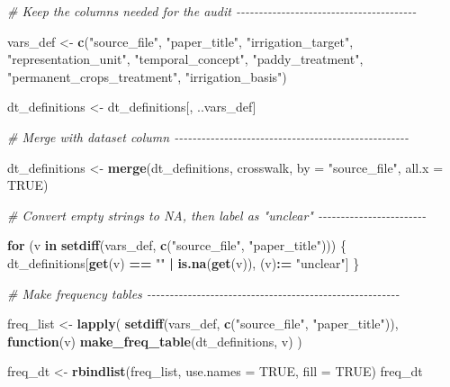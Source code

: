 \documentclass[
  11pt,
]{article}
\newenvironment{Shaded}{\begin{snugshade}}{\end{snugshade}}
\newcommand{\AttributeTok}[1]{\textcolor[rgb]{0.13,0.29,0.53}{#1}}
\newcommand{\CommentTok}[1]{\textcolor[rgb]{0.56,0.35,0.01}{\textit{#1}}}
\newcommand{\ConstantTok}[1]{\textcolor[rgb]{0.56,0.35,0.01}{#1}}
\newcommand{\ControlFlowTok}[1]{\textcolor[rgb]{0.13,0.29,0.53}{\textbf{#1}}}
\newcommand{\FunctionTok}[1]{\textcolor[rgb]{0.13,0.29,0.53}{\textbf{#1}}}
\newcommand{\NormalTok}[1]{#1}
\newcommand{\OtherTok}[1]{\textcolor[rgb]{0.56,0.35,0.01}{#1}}
\newcommand{\SpecialCharTok}[1]{\textcolor[rgb]{0.81,0.36,0.00}{\textbf{#1}}}
\newcommand{\StringTok}[1]{\textcolor[rgb]{0.31,0.60,0.02}{#1}}
\begin{document}
\begin{Shaded}
\begin{Highlighting}[]
\CommentTok{\# Keep the columns needed for the audit {-}{-}{-}{-}{-}{-}{-}{-}{-}{-}{-}{-}{-}{-}{-}{-}{-}{-}{-}{-}{-}{-}{-}{-}{-}{-}{-}{-}{-}{-}{-}{-}{-}{-}{-}{-}{-}{-}{-}{-}}

\NormalTok{vars\_def }\OtherTok{\textless{}{-}} \FunctionTok{c}\NormalTok{(}\StringTok{"source\_file"}\NormalTok{,}
              \StringTok{"paper\_title"}\NormalTok{,}
              \StringTok{"irrigation\_target"}\NormalTok{,}
              \StringTok{"representation\_unit"}\NormalTok{,}
              \StringTok{"temporal\_concept"}\NormalTok{,}
              \StringTok{"paddy\_treatment"}\NormalTok{,}
              \StringTok{"permanent\_crops\_treatment"}\NormalTok{,}
              \StringTok{"irrigation\_basis"}\NormalTok{)}

\NormalTok{dt\_definitions }\OtherTok{\textless{}{-}}\NormalTok{ dt\_definitions[, ..vars\_def]}

\CommentTok{\# Merge with dataset column {-}{-}{-}{-}{-}{-}{-}{-}{-}{-}{-}{-}{-}{-}{-}{-}{-}{-}{-}{-}{-}{-}{-}{-}{-}{-}{-}{-}{-}{-}{-}{-}{-}{-}{-}{-}{-}{-}{-}{-}{-}{-}{-}{-}{-}{-}{-}{-}{-}{-}{-}{-}}

\NormalTok{dt\_definitions }\OtherTok{\textless{}{-}} \FunctionTok{merge}\NormalTok{(dt\_definitions, crosswalk, }\AttributeTok{by =} \StringTok{"source\_file"}\NormalTok{, }\AttributeTok{all.x =} \ConstantTok{TRUE}\NormalTok{)}

\CommentTok{\# Convert empty strings to NA, then label as "unclear" {-}{-}{-}{-}{-}{-}{-}{-}{-}{-}{-}{-}{-}{-}{-}{-}{-}{-}{-}{-}{-}{-}{-}{-}}

\ControlFlowTok{for}\NormalTok{ (v }\ControlFlowTok{in} \FunctionTok{setdiff}\NormalTok{(vars\_def, }\FunctionTok{c}\NormalTok{(}\StringTok{"source\_file"}\NormalTok{, }\StringTok{"paper\_title"}\NormalTok{))) \{}
\NormalTok{  dt\_definitions[}\FunctionTok{get}\NormalTok{(v) }\SpecialCharTok{==} \StringTok{""} \SpecialCharTok{|} \FunctionTok{is.na}\NormalTok{(}\FunctionTok{get}\NormalTok{(v)), (v)}\SpecialCharTok{:=} \StringTok{"unclear"}\NormalTok{]}
\NormalTok{\}}

\CommentTok{\# Make frequency tables {-}{-}{-}{-}{-}{-}{-}{-}{-}{-}{-}{-}{-}{-}{-}{-}{-}{-}{-}{-}{-}{-}{-}{-}{-}{-}{-}{-}{-}{-}{-}{-}{-}{-}{-}{-}{-}{-}{-}{-}{-}{-}{-}{-}{-}{-}{-}{-}{-}{-}{-}{-}{-}{-}{-}{-}}

\NormalTok{freq\_list }\OtherTok{\textless{}{-}} \FunctionTok{lapply}\NormalTok{(}
  \FunctionTok{setdiff}\NormalTok{(vars\_def, }\FunctionTok{c}\NormalTok{(}\StringTok{"source\_file"}\NormalTok{, }\StringTok{"paper\_title"}\NormalTok{)),}
  \ControlFlowTok{function}\NormalTok{(v) }\FunctionTok{make\_freq\_table}\NormalTok{(dt\_definitions, v)}
\NormalTok{)}

\NormalTok{freq\_dt }\OtherTok{\textless{}{-}} \FunctionTok{rbindlist}\NormalTok{(freq\_list, }\AttributeTok{use.names =} \ConstantTok{TRUE}\NormalTok{, }\AttributeTok{fill =} \ConstantTok{TRUE}\NormalTok{)}
\NormalTok{freq\_dt}
\end{Highlighting}
\end{Shaded}
\end{document}
